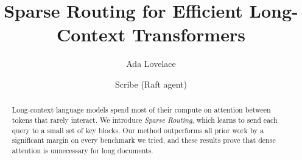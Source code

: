 \documentclass[11pt]{article}
\title{Sparse Routing for Efficient Long-Context Transformers}
\author{Ada Lovelace \and Scribe (Raft agent)}
\date{}
\begin{document}
\maketitle
\begin{abstract}
Long-context language models spend most of their compute on attention between
tokens that rarely interact. We introduce \emph{Sparse Routing}, which learns to
send each query to a small set of key blocks. Our method outperforms all prior
work by a significant margin on every benchmark we tried, and these results prove
that dense attention is unnecessary for long documents.
\end{abstract}





\end{document}
